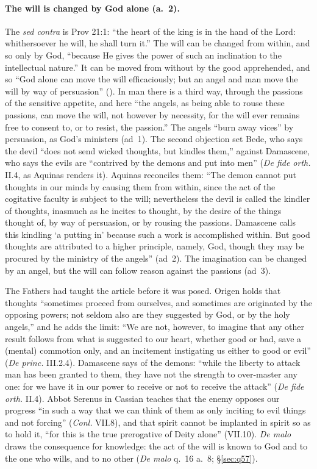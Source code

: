 \paragraph{The will is changed by God alone (a.~2).} The \emph{sed contra}
is Prov 21:1: ``the heart of the king is in the hand of the Lord:
whithersoever he will, he shall turn it.'' The will can be changed from
within, and so only by God, ``because He gives the power of such an
inclination to the intellectual nature.'' It can be moved from without by
the good apprehended, and so ``God alone can move the will efficaciously;
but an angel and man move the will by way of persuasion'' (). In man there is a third way, through the passions of
the sensitive appetite, and here ``the angels, as being able to rouse these
passions, can move the will, not however by necessity, for the will ever
remains free to consent to, or to resist, the passion.'' The angels ``burn
away vices'' by persuasion, as God's ministers (ad~1). The second objection
set Bede, who says the devil ``does not send wicked thoughts, but kindles
them,'' against Damascene, who says the evils are ``contrived by the demons
and put into men'' (\emph{De fide orth.} II.4, as Aquinas renders it).
Aquinas reconciles them: ``The demon cannot put thoughts in our minds by
causing them from within, since the act of the cogitative faculty is
subject to the will; nevertheless the devil is called the kindler of
thoughts, inasmuch as he incites to thought, by the desire of the things
thought of, by way of persuasion, or by rousing the passions. Damascene
calls this kindling `a putting in' because such a work is accomplished
within. But good thoughts are attributed to a higher principle, namely,
God, though they may be procured by the ministry of the angels'' (ad~2).
The imagination can be changed by an angel, but the will can follow reason
against the passions (ad~3).

The Fathers had taught the article before it was posed. Origen holds that
thoughts ``sometimes proceed from ourselves, and sometimes are originated
by the opposing powers; not seldom also are they suggested by God, or by
the holy angels,'' and he adds the limit: ``We are not, however, to imagine
that any other result follows from what is suggested to our heart, whether
good or bad, save a (mental) commotion only, and an incitement instigating
us either to good or evil'' (\emph{De princ.} III.2.4). Damascene says of
the demons: ``while the liberty to attack man has been granted to them,
they have not the strength to over-master any one: for we have it in our
power to receive or not to receive the attack'' (\emph{De fide orth.}
II.4). Abbot Serenus in Cassian teaches that the enemy opposes our progress
``in such a way that we can think of them as only inciting to evil things
and not forcing'' (\emph{Conl.} VII.8), and that spirit cannot be implanted
in spirit so as to hold it, ``for this is the true prerogative of Deity
alone'' (VII.10). \emph{De malo} draws the consequence for knowledge: the
act of the will is known to God and to the one who wills, and to no other
(\emph{De malo} q.~16 a.~8; \S\ref{sec:q57}).


